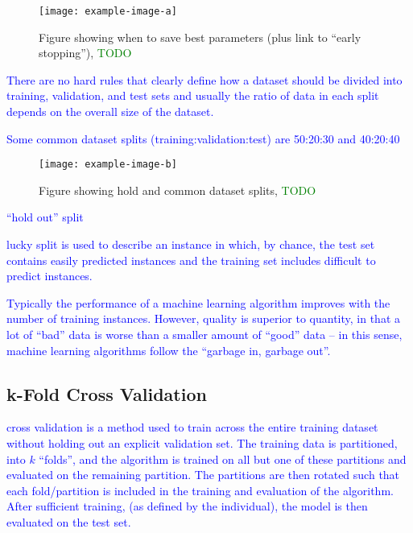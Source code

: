 \begin{figure}[htp]
	\centering
	\texttt{[image: example-image-a]}\hfil
	\caption{Figure showing when to save best parameters (plus link to ``early stopping''), \textcolor{green}{TODO}}
	\label{fig:sample_split_save_best_params}
\end{figure}

\textcolor{blue}{There are no hard rules that clearly define how a dataset should be divided into training, validation, and test sets and usually the ratio of data in each split depends on the overall size of the dataset.}

\textcolor{blue}{Some common dataset splits (training:validation:test) are 50:20:30 and 40:20:40}

\begin{figure}[htp]
	\centering
	\texttt{[image: example-image-b]}\hfil
	\caption{Figure showing hold and common dataset splits, \textcolor{green}{TODO}}
	\label{fig:sample_split_hold_out}
\end{figure}

\textcolor{blue}{``hold out'' split}

\textcolor{blue}{{lucky split} is used to describe an instance in which, by chance, the test set contains easily predicted instances and the training set includes difficult to predict instances.}

\textcolor{blue}{Typically the performance of a machine learning algorithm improves with the number of training instances. However, quality is superior to quantity, in that a lot of ``bad'' data is worse than a smaller amount of ``good'' data -- in this sense, machine learning algorithms follow the ``garbage in, garbage out''.}



\subsection{k-Fold Cross Validation}

\textcolor{blue}{cross validation is a method used to train across the entire training dataset without holding out an explicit validation set. The training data is partitioned, into $k$ ``folds'', and the algorithm is trained on all but one of these partitions and evaluated on the remaining partition. The partitions are then rotated such that each fold/partition is included in the training and evaluation of the algorithm. After sufficient training, (as defined by the individual), the model is then evaluated on the test set.}


